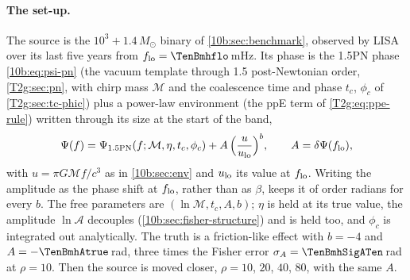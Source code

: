 \paragraph{The set-up.} The source is the $10^3+1.4\,M_\odot$ binary of \cref{10b:sec:benchmark}, observed by LISA over
its last five years from $f_{\rm lo}=\TenBmhflo$\,mHz. Its phase is the 1.5PN phase \eqref{10b:eq:psi-pn} (the vacuum template through 1.5 post-Newtonian order,
\cref{T2g:sec:pn}, with chirp mass $\mathcal M$ and the coalescence time and phase $t_c$, $\phi_c$ of
\cref{T2g:sec:tc-phic}) plus a power-law environment (the ppE term of \cref{T2g:eq:ppe-rule}) written through its
size at the start of the band,
\begin{equation}
  \Psi(f)=\Psi_{\rm 1.5PN}(f;\mathcal M,\eta,t_c,\phi_c)+A\,\Big(\frac{u}{u_{\rm lo}}\Big)^{b},
  \qquad A=\delta\Psi(f_{\rm lo}),
  \label{10b:eq:mh-model}
\end{equation}
with $u=\pi G\mathcal Mf/c^3$ as in \cref{10b:sec:env} and $u_{\rm lo}$ its value at $f_{\rm lo}$. Writing the amplitude
as the phase shift at $f_{\rm lo}$, rather than as $\beta$, keeps it of order radians for every $b$. The free parameters
are $(\ln\mathcal M,t_c,A,b)$; $\eta$ is held at its true value, the amplitude $\ln\mathcal A$ decouples
(\cref{10b:sec:fisher-structure}) and is held too, and $\phi_c$ is integrated out analytically. The truth is a
friction-like effect with $b=-4$ and $A=-\TenBmhAtrue$\,rad, three times the Fisher error $\sigma_A=\TenBmhSigATen$\,rad
at $\rho=10$. Then the source is moved closer, $\rho=10$, $20$, $40$, $80$, with the same $A$.

